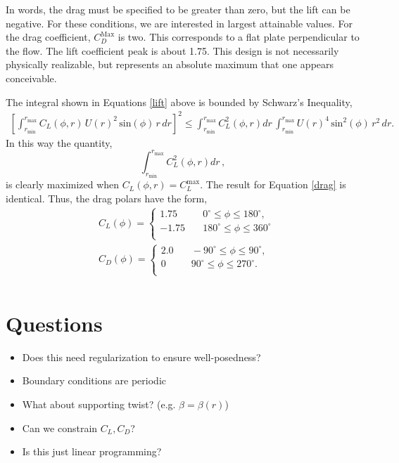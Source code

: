 \documentclass{article}
\begin{document}
In words, the drag must be specified to be greater than zero, but
the lift can be negative. For these conditions, we are interested in
largest attainable values. For the drag coefficient, $C_D^{\text{Max}}$
is two. %
This corresponds to a flat plate perpendicular to the flow.
The lift coefficient peak is about 1.75. This design is not necessarily
physically realizable, but represents an absolute maximum that one
appears conceivable. 

The integral shown in Equations \ref{lift} above is bounded by 
Schwarz's Inequality,  
\begin{align}
  \left[\int_{r_{\text{min}}}^{r_{\text{max}}} C_L(\phi,r)\, U(r)^2
 \,\text{sin}(\phi)\, r\,dr \right]^2 \le 
 \int_{r_{\text{min}}}^{r_{\text{max}}} C_L^2(\phi,r) dr \,
 \int_{r_{\text{min}}}^{r_{\text{max}}} U(r)^4 
 \,\text{sin}^2(\phi)\, r^2\,dr.
\end{align}
In this way the quantity,
\begin{equation}
 \int_{r_{\text{min}}}^{r_{\text{max}}} C_L^2(\phi,r) dr \,, 
\end{equation}
is clearly maximized when $C_L(\phi,r) = C_L^{\text{max}}$. 
The result for Equation \ref{drag} is identical. Thus, the drag polars
have the form, 
\begin{align*} 
 &C_L(\phi) = 
  \begin{cases}
    1.75& \quad 0^{\circ} \le \phi \le 180^{\circ}, \\
   -1.75& \quad 180^{\circ} \le \phi \le 360^{\circ}  \\
  \end{cases}\\
 &C_D(\phi) = 
  \begin{cases}
    2.0& \quad -90^{\circ} \le \phi \le 90^{\circ}, \\
      0& \quad 90^{\circ} \le \phi \le 270^{\circ}.  \\
  \end{cases}\\
\end{align*}

\newpage
\section{Questions}

\begin{itemize}
 \item Does this need regularization to ensure well-posedness?
 \item Boundary conditions are periodic
 \item What about supporting twist? (e.g. $\beta = \beta(r)$)
 \item Can we constrain $C_L, C_D$?
 \item Is this just linear programming?
\end{itemize}
\end{document}

